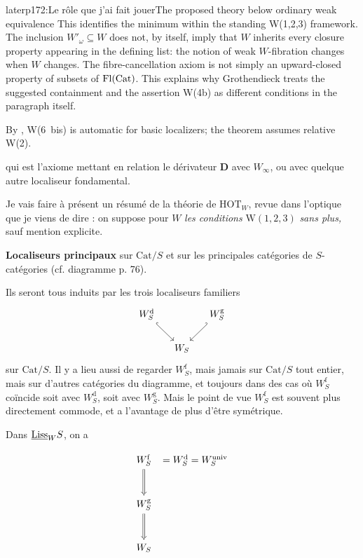 \begin{dcomment}{later}{p172:Le rôle que j'ai fait jouer}{The proposed theory below ordinary weak equivalence}
This identifies the minimum within the standing W(1,2,3) framework. The inclusion $W'_\omega\subseteq W$ does not, by itself, imply that $W$ inherits every closure property appearing in the defining list: the notion of weak $W$-fibration changes when $W$ changes. The fibre-cancellation axiom is not simply an upward-closed property of subsets of $\mathrm{Fl}(\mathrm{Cat})$. This explains why Grothendieck treats the suggested containment and the assertion W(4b) as different conditions in the paragraph itself.

By \citet[Corollary~4.2.22]{Cisinski2006}, W(6~bis) is automatic for basic localizers; the theorem assumes relative W(2).
\end{dcomment}



qui est l'axiome mettant en relation le dérivateur $\mathbf{D}$ avec $W_\infty$, ou avec quelque autre localiseur fondamental.

Je vais faire à présent un résumé de la théorie de $\mathrm{HOT}_W$, revue dans l'optique que je viens de dire : on suppose pour $W$ \textit{les conditions} $\mathrm{W}(1,2,3)$ \textit{sans plus,} sauf mention explicite.

 \textbf{Localiseurs principaux} sur $\mathrm{Cat}/S$ et sur les principales catégories de $S$-catégories (cf. diagramme p. 76).

Ils seront tous induits par les trois localiseurs familiers
\[
\begin{tikzcd}[column sep=small]
W_S^{\mathrm{d}} \arrow[dr, hook] & & W_S^{\mathrm{g}} \arrow[dl, hook'] \\
& W_S &
\end{tikzcd}
\]
sur $\mathrm{Cat}/S$. Il y a lieu aussi de regarder $W_S^{\mathrm{f}}$, mais jamais sur $\mathrm{Cat}/S$ tout entier, mais sur d'autres catégories du diagramme, et toujours dans des cas où $W_S^{\mathrm{f}}$ coïncide soit avec $W_S^{\mathrm{d}}$, soit avec $W_S^{\mathrm{g}}$. Mais le point de vue $W_S^{\mathrm{f}}$ est souvent plus directement commode, et a l'avantage de plus d'être symétrique.

 Dans $\underline{\mathrm{Liss}}_W S$, on a


\[
\begin{tikzcd}[row sep=large, column sep=0pt]
W_S^{\mathrm{f}} \arrow[d, Rightarrow] & {} = W_S^{\mathrm{d}} = W_S^{\mathrm{univ}} \\
W_S^{\mathrm{g}} \arrow[d, Rightarrow] & \\
W_S &
\end{tikzcd}
\]

